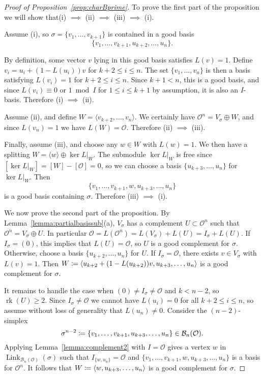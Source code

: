 \documentclass[11 pt]{article}
\theoremstyle{plain}
\theoremstyle{definition}
\numberwithin{equation}{section}
\newcommand\Span[1]{\ensuremath{\langle #1 \rangle}}
\renewcommand{\O}{\mathcal{O}}
\newcommand\PartialBases{\ensuremath{\mathcal{B}}}
\newcommand{\PB}{\PartialBases}
\DeclareMathOperator{\Link}{Link}
\newcommand\coloneq{\mathrel{\mathop:}\mkern-1.2mu=}
\DeclareMathOperator{\Rank}{rk}
\begin{document}
\begin{proof}[{Proof of Proposition~\ref{prop:charBprime}}]
To prove the first part of the proposition we will show that\linebreak (i) $\implies$ (ii) $\implies$ (iii) $\implies$ (i).

Assume (i), so $\sigma=\{v_1,\ldots,v_{k+1}\}$ is contained in a good basis 
\[\{v_1,\ldots,v_{k+1},u_{k+2},\ldots,u_n\}.\]
 
By definition, some vector $v$ lying in this good basis satisfies $L(v)=1$.
Define $v_i=u_i+(1-L(u_i))v$ for $k+2 \leq i \leq n$.  The set $\{v_1,\ldots,v_n\}$ is then a basis
satisfying $L(v_i)=1$ for $k+2 \leq i \leq n$. 
Since $k+1<n$, this is a good basis, and since $L(v_i)\equiv 0\text{ or }1\bmod{I}$ for $1 \leq i \leq k+1$ by assumption, it is also an $I$-basis. 
Therefore (i) $\implies$ (ii).  

Assume (ii), and define $W=\langle v_{k+2},\ldots,v_n\rangle$.  We certainly have $\O^n=V_\sigma\oplus W$, and since $L(v_n)=1$ we have $L(W)=\O$. 
Therefore (ii) $\implies$ (iii).

Finally, assume (iii), and choose any $w\in W$ with $L(w)=1$.  We then have a splitting $W=\langle w\rangle\oplus \ker L|_W$. The submodule $\ker L|_W$ is free since $[\ker L|_W]=[W]-[\O]=0$, so we can choose a basis $\{u_{k+3},\ldots,u_n\}$ for $\ker L|_W$. Then 
\[\{v_1,\ldots,v_{k+1},w,u_{k+3},\ldots,u_n\}\] 
is a good basis containing $\sigma$. Therefore (iii) $\implies$ (i).

We now prove the second part of the proposition. By Lemma~\ref{lemma:partialbasissub}(a), $V_\sigma$ has a complement $U \subset \O^n$ such that $\O^n = V_\sigma \oplus U$.
In particular $\O=L(\O^n) = L(V_\sigma)+L(U)=I_\sigma+L(U)$.  If $I_\sigma=(0)$, this implies that $L(U) = \O$, so $U$ is a good complement
for $\sigma$.
Otherwise, choose a basis $\{u_{k+2},\ldots,u_n\}$ for $U$.  If $I_\sigma=\O$, there exists $v\in V_\sigma$ with $L(v)=1$. Then $W\coloneq\langle u_{k+2}+(1-L(u_{k+2}))v,u_{k+3},\ldots,u_n\rangle$ is a good complement for $\sigma$.

It remains to handle the case when $(0)\neq I_\sigma\neq \O$ and $k<n-2$, so $\Rank(U)\geq 2$.
Since $I_\sigma\neq \O$ we cannot have $L(u_i)=0$ for all $k+2\leq i\leq n$, so assume without loss of generality that $L(u_n) \neq 0$. Consider the $(n-2)$-simplex
\[\sigma^{n-2}\coloneq\{v_1,\ldots,v_{k+1},u_{k+3},\ldots,u_n\}\in \PB_n(\O).\]
Applying Lemma~\ref{lemma:complement2} with $I=\O$ gives a vertex $w$ in $\Link_{\PB_n(\O)}(\sigma)$ such that  $I_{\{w,u_n\}}=\O$ and $\{v_1,\ldots,v_{k+1},w,u_{k+3},\ldots,u_n\}$
is a basis for $\O^n$. It follows that
$W\coloneq \Span{w,u_{k+3},\ldots,u_n}$ is a good complement for $\sigma$.
\end{proof}
\end{document}
